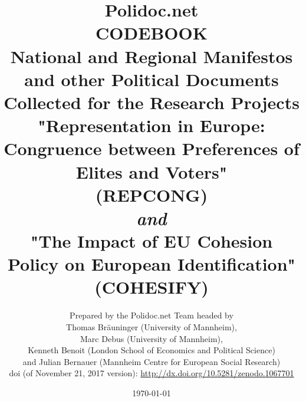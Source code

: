 \documentclass[a4paper, 12pt]{article}
\begin{document}
\title{Polidoc.net \\
CODEBOOK \\
\large
\medskip
National and Regional Manifestos and other Political Documents Collected for the Research Projects
\\
"Representation in Europe: Congruence between Preferences of Elites and Voters" \\ (REPCONG)
\\
\textit{and} 
\\
"The Impact of EU Cohesion Policy on European Identification" \\ (COHESIFY)
} 

\date{
\today
}

\author{
\small
Prepared by the Polidoc.net Team headed by \\ \small
 Thomas Bräuninger (University of Mannheim), \\ \small
 Marc Debus (University of Mannheim), \\ \small
 Kenneth Benoit (London School of Economics and Political Science) \\ \small
 and Julian Bernauer (Mannheim Centre for European Social Research) \\ \small
doi (of November 21, 2017 version): \url{http://dx.doi.org/10.5281/zenodo.1067701}
}

\maketitle

\clearpage
\end{document}
